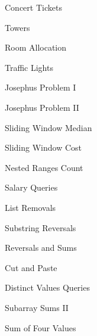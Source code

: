 \begin{practice}
\begin{pplist}
  \item Concert Tickets
  \item Towers
  \item Room Allocation
  \item Traffic Lights
  \item Josephus Problem I
  \item Josephus Problem II
  \item Sliding Window Median
  \item Sliding Window Cost
  \item Nested Ranges Count
  \item Salary Queries
  \item List Removals
\end{pplist}
\begin{pplist}
  \item Substring Reversals
  \item Reversals and Sums
  \item Cut and Paste
  \item Distinct Values Queries
  \item Subarray Sums II
  \item Sum of Four Values
\end{pplist}
\end{practice}
